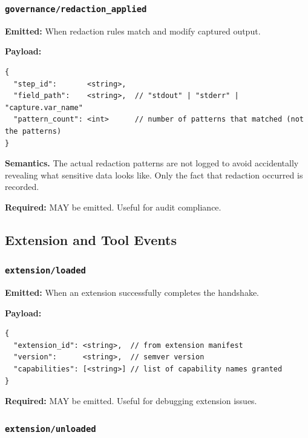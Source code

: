 
\subsubsection{\texttt{governance/redaction\_applied}}

\textbf{Emitted:} When redaction rules match and modify captured output.

\textbf{Payload:}
\begin{verbatim}
{
  "step_id":       <string>,
  "field_path":    <string>,  // "stdout" | "stderr" | "capture.var_name"
  "pattern_count": <int>      // number of patterns that matched (not the patterns)
}
\end{verbatim}

\textbf{Semantics.} The actual redaction patterns are not logged to avoid accidentally revealing what sensitive data looks like. Only the fact that redaction occurred is recorded.

\textbf{Required:} MAY be emitted. Useful for audit compliance.


\subsection{Extension and Tool Events}

\subsubsection{\texttt{extension/loaded}}

\textbf{Emitted:} When an extension successfully completes the handshake.

\textbf{Payload:}
\begin{verbatim}
{
  "extension_id": <string>,  // from extension manifest
  "version":      <string>,  // semver version
  "capabilities": [<string>] // list of capability names granted
}
\end{verbatim}

\textbf{Required:} MAY be emitted. Useful for debugging extension issues.


\subsubsection{\texttt{extension/unloaded}}

